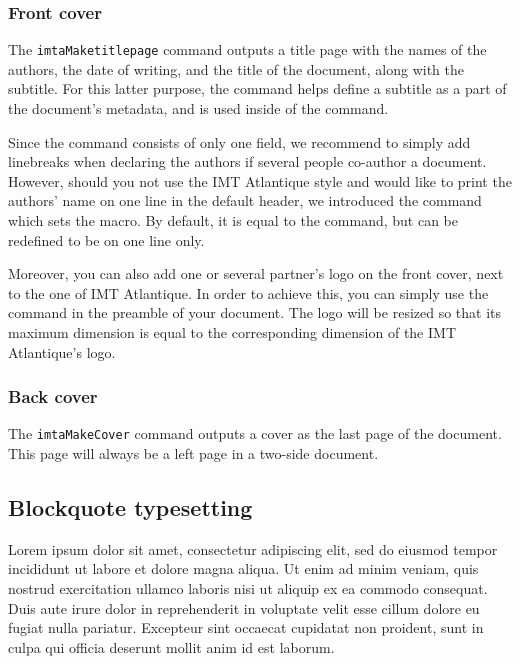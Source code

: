 \documentclass{report}
\begin{document}
\subsubsection{Front cover}
The \texttt{imtaMaketitlepage} command outputs a title page with the names of the authors, the date of writing, and the title of the document, along with the subtitle.
For this latter purpose, the  command helps define a subtitle as a part of the document's metadata, and %
is used inside of the  command.

Since the  command consists of only one field, we recommend to simply add linebreaks when declaring the authors if several people co-author a document. However, should you not use the IMT Atlantique style and would like to print the authors' name on one line in the default header, we introduced the  command which sets the  macro. By default, it is equal to the  command, but can be redefined to be on one line only.

Moreover, you can also add one or several partner's logo on the front cover, next to the one of IMT Atlantique. In order to achieve this, you can simply use the  command in the preamble of your document. The logo will be resized so that its maximum dimension is equal to the corresponding dimension of the IMT Atlantique's logo.


\subsubsection{Back cover}

The \texttt{imtaMakeCover} command outputs a cover as the last page of the document.
This page will always be a left page in a two-side document.


\subsection{Blockquote typesetting}
\label{sec:core:quote}

\begin{imtaQuote}
Lorem ipsum dolor sit amet, consectetur adipiscing elit, sed do eiusmod tempor incididunt ut labore et dolore magna aliqua. 
Ut enim ad minim veniam, quis nostrud exercitation ullamco laboris nisi ut aliquip ex ea commodo consequat. 
Duis aute irure dolor in reprehenderit in voluptate velit esse cillum dolore eu fugiat nulla pariatur.
Excepteur sint occaecat cupidatat non proident, sunt in culpa qui officia deserunt mollit anim id est laborum.
\end{imtaQuote}
\end{document}
